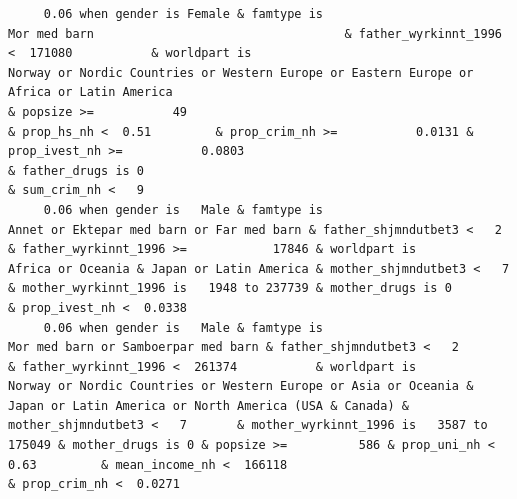\documentclass[
  letterpaper,
  DIV=11,
  numbers=noendperiod]{scrreprt}
\begin{document}
\begin{verbatim}
     0.06 when gender is Female & famtype is                                                     Mor med barn                                   & father_wyrkinnt_1996 <  171080           & worldpart is                                           Norway or Nordic Countries or Western Europe or Eastern Europe or Africa or Latin America                                                                                                  & popsize >=           49                                                                    & prop_hs_nh <  0.51         & prop_crim_nh >=           0.0131 & prop_ivest_nh >=           0.0803                                                                                                                          & father_drugs is 0                                                                        & sum_crim_nh <   9
     0.06 when gender is   Male & famtype is                        Annet or Ektepar med barn or Far med barn & father_shjmndutbet3 <   2       & father_wyrkinnt_1996 >=            17846 & worldpart is                                                                                          Africa or Oceania & Japan or Latin America & mother_shjmndutbet3 <   7       & mother_wyrkinnt_1996 is   1948 to 237739 & mother_drugs is 0                                                                                                                                                              & prop_ivest_nh <  0.0338                                                                                                                                                                                                                                                  
     0.06 when gender is   Male & famtype is                              Mor med barn or Samboerpar med barn & father_shjmndutbet3 <   2       & father_wyrkinnt_1996 <  261374           & worldpart is            Norway or Nordic Countries or Western Europe or Asia or Oceania & Japan or Latin America or North America (USA & Canada) & mother_shjmndutbet3 <   7       & mother_wyrkinnt_1996 is   3587 to 175049 & mother_drugs is 0 & popsize >=          586 & prop_uni_nh <  0.63         & mean_income_nh <  166118                                        & prop_crim_nh <  0.0271                                                                                                                                                                                                                                                                                      

\end{verbatim}
\end{document}
